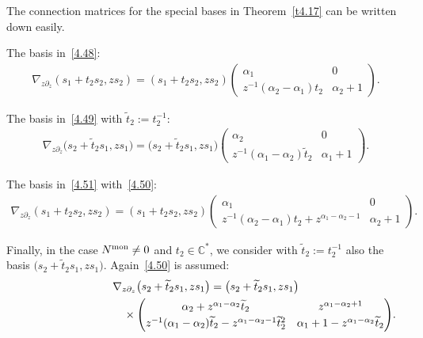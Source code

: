 \documentclass[pdftex]{sigma}%
\numberwithin{equation}{section}
\numberwithin{figure}{section}
\newcommand{\C}{{\mathbb C}}
\newcommand{\www}{\widetilde}
\newcommand{\paa}{\partial}
\newcommand{\nnn}{\nabla}
\begin{document}
\begin{Remark}\label{t4.19}
The connection matrices for the special bases in
Theorem~\ref{t4.17} can be written down easily.

The basis in~\eqref{4.48}:
\begin{gather}\label{4.57}
\nnn_{z\paa_z}(s_1+t_2s_2,zs_2)=
(s_1+t_2s_2,zs_2)\begin{pmatrix}\alpha_1 & 0 \\
z^{-1}(\alpha_2-\alpha_1)t_2 & \alpha_2+1\end{pmatrix}\!.
\end{gather}

The basis in~\eqref{4.49} with $\www t_2:=t_2^{-1}$:
\begin{gather}\label{4.58}
\nnn_{z\paa_z}\big(s_2+\www t_2s_1,zs_1\big)=
\big(s_2+\www t_2s_1,zs_1\big)\begin{pmatrix}\alpha_2 & 0 \\
z^{-1}(\alpha_1-\alpha_2)\www t_2 & \alpha_1+1\end{pmatrix}\!.
\end{gather}

The basis in~\eqref{4.51} with~\eqref{4.50}:
\begin{gather}\label{4.59}
\nnn_{z\paa_z}(s_1+t_2s_2,zs_2)=
(s_1+t_2s_2,zs_2)
\begin{pmatrix}\alpha_1 & 0 \\
z^{-1}(\alpha_2-\alpha_1)t_2 +z^{\alpha_1-\alpha_2-1}
& \alpha_2+1\end{pmatrix}\!.
\end{gather}

Finally, in the case $N^{\rm mon}\neq 0$ and $t_2\in\C^*$,
we consider with $\www t_2:=t_2^{-1}$ also the basis
$\big(s_2+\www t_2 s_1,zs_1\big)$. Again~\eqref{4.50} is assumed:
\begin{gather}
\nnn_{z\paa_z}\big(s_2+\www t_2s_1,zs_1\big)=\big(s_2+\www t_2s_1,zs_1\big)\nonumber
\\ \hphantom{\nnn_{z\paa_z}(s_2+\www t_2s_1,zs_1)=}
{}\times\begin{pmatrix}\alpha_2
+z^{\alpha_1-\alpha_2}\www t_2 &
z^{\alpha_1-\alpha_2+1} \\[.5ex]
z^{-1}(\alpha_1-\alpha_2)\www t_2 -z^{\alpha_1-\alpha_2-1}
\www t_2^2 & \alpha_1+1-z^{\alpha_1-\alpha_2}\www t_2
\end{pmatrix}\!.
\end{gather}\label{4.60}
\end{Remark}
\end{document}
